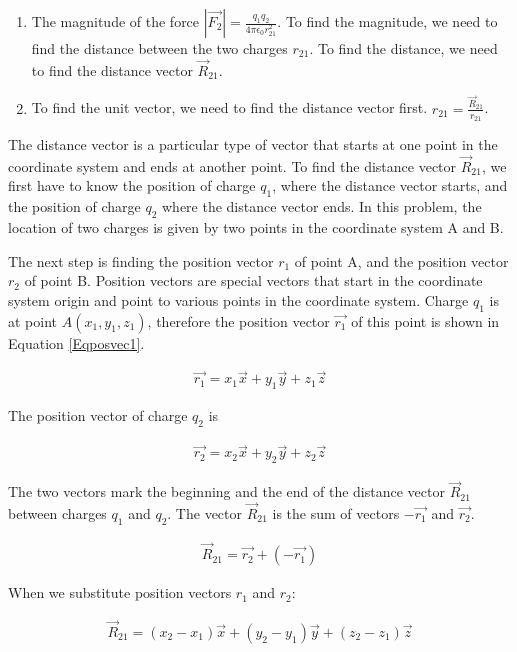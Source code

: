\documentclass{ximera}
\begin{document}
\begin{example}
\begin{explanation}
\begin{enumerate} 
\item The magnitude of the force $|\vec{F_2}|=\frac{q_1 q_2}{4 \pi \epsilon_0 r_{21}^2}$. To find the magnitude, we need to find the distance between the two charges $r_{21}$. To find the distance, we need to find the distance vector $\vec{R}_{21}$. 
\item To find the unit vector, we need to find the distance vector first. $\hat{r}_{21}=\frac{\vec{R}_{21}}{r_{21}}$.
\end{enumerate}

The distance vector is a particular type of vector that starts at one point in the coordinate system and ends at another point. To find the distance vector $\vec{R}_{21}$, we first have to know the position of charge $q_1$, where the distance vector starts, and the position of charge $q_2$ where the distance vector ends. In this problem, the location of two charges is given by two points in the coordinate system A and B.  

The next step is finding the position vector $r_1$ of point A, and the position vector $r_2$ of point B. Position vectors are special vectors that start in the coordinate system origin and point to various points in the coordinate system. Charge $q_1$ is at point $A(x_1,y_1,z_1)$, therefore the position vector $\vec{r_1}$ of this point is  shown in Equation \ref{Eqposvec1}.


\begin{eqnarray}
\vec{r_1}=x_1 \vec{x} + y_1 \vec{y} +z_1 \vec{z} \label{Eqposvec1}
\end{eqnarray}

The position vector of charge $q_2$ is 

\begin{eqnarray}
\vec{r_2}=x_2\vec{x} + y_2 \vec{y} +z_2 \vec{z}
\end{eqnarray}

The two vectors mark the beginning and the end of the distance vector $\vec{R}_{21}$  between charges $q_1$ and $q_2$. The vector  $\vec{R}_{21}$ is the sum of vectors $-\vec{r_1}$ and $\vec{r_2}$. 



\begin{eqnarray}
\vec{R}_{21}=\vec{r_2} + (-\vec{r_1})
\end{eqnarray}

When we substitute position vectors $r_1$ and $r_2$:

\begin{eqnarray}
\vec{R}_{21}= (x_2 - x_1) \vec{x} +(y_2 - y_1) \vec{y} +(z_2 - z_1) \vec{z}
\end{eqnarray}


\end{explanation}
\end{example}
\end{document}
